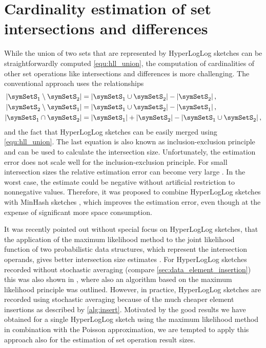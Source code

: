\documentclass[a4paper]{scrartcl}
\begin{document}
\section{Cardinality estimation of set intersections and differences}

While the union of two sets that are represented by HyperLogLog sketches can be straightforwardly computed \eqref{equ:hll_union}, the computation of cardinalities of other set operations like intersections and differences is more challenging. The conventional approach uses the relationships
\begin{equation}
\label{equ:conventional_approach}
\begin{aligned}
\left\vert\symSetS_1 \setminus \symSetS_2\right\vert
&=
\left\vert\symSetS_1 \cup \symSetS_2\right\vert
-
\left\vert\symSetS_2\right\vert,
\\
\left\vert\symSetS_2 \setminus \symSetS_1\right\vert
&=
\left\vert\symSetS_1 \cup \symSetS_2\right\vert
-
\left\vert\symSetS_1\right\vert,
\\
\left\vert\symSetS_1 \cap \symSetS_2\right\vert
&=  
\left\vert\symSetS_1\right\vert  
+
\left\vert\symSetS_2\right\vert
-
\left\vert\symSetS_1 \cup \symSetS_2\right\vert,
\end{aligned}
\end{equation}
and the fact that HyperLogLog sketches can be easily merged using \eqref{equ:hll_union}. The last equation is also known as inclusion-exclusion principle and can be used to calculate the intersection size. Unfortunately, the estimation error does not scale well for the inclusion-exclusion principle. For small intersection sizes the relative estimation error can become very large \cite{Dasgupta2015}. In the worst case, the estimate could be negative without artificial restriction to nonnegative values. Therefore, it was proposed to combine HyperLogLog sketches with MinHash sketches \cite{Pascoe2013, Cohen2016}, which improves the estimation error, even though at the expense of significant more space consumption. 

It was recently pointed out without special focus on HyperLogLog sketches, that the application of the maximum likelihood method to the joint likelihood function of two probabilistic data structures, which represent the intersection operands, gives better intersection size estimates \cite{Ting2016}. For HyperLogLog sketches recorded without stochastic averaging (compare \cref{sec:data_element_insertion}) this was also shown in \cite{Cohen2016}, where also an algorithm based on the maximum likelihood principle was outlined. However, in practice, HyperLogLog sketches are recorded using stochastic averaging because of the much cheaper element insertions as described by \cref{alg:insert}. Motivated by the good results we have obtained for a single HyperLogLog sketch using the maximum likelihood method in combination with the Poisson approximation, we are tempted to apply this approach also for the estimation of set operation result sizes.
\end{document}
